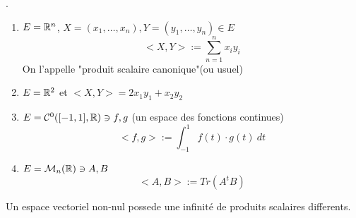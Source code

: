 \begin{eg}.
   \begin{enumerate}
       \item $E = \mathbb{R}^n$,  $X = (x_1, \ldots, x_n), Y = (y_1, \ldots, y_n) \in E$\\
           \[
               <X, Y> := \sum_{n=1}^{n} x_iy_i
           \] 
           On l'appelle "produit scalaire canonique"(ou usuel)
        \item $E = \mathbb{R}^2$ et  $<X, Y> = 2x_1y_1 + x_2y_2$
        \item $E = \mathcal{C}^0([-1, 1], \mathbb{R}) \ni f, g$ (un espace des fonctions continues)
            \[
                <f, g> := \int_{-1}^{1} f(t) \cdot g(t) \: d{t} 
            \] 
        \item $E = \mathcal{M}_n(\mathbb{R}) \ni A, B$
             \[
            <A, B> := Tr(A^tB)
            \] 
   \end{enumerate} 
\end{eg}

\begin{prop}
    Un espace vectoriel non-nul possede une infinité de produits scalaires differents.   
\end{prop} 

